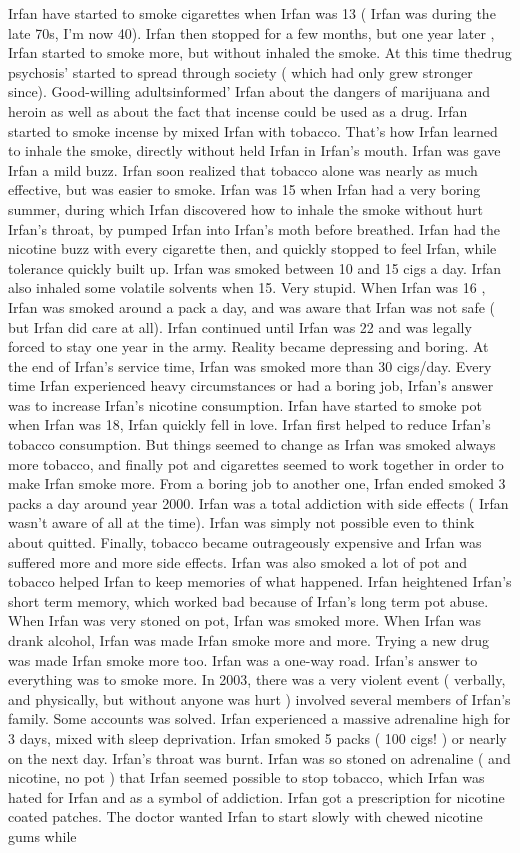 \documentclass[12pt]{book}
\begin{document}
Irfan have started to smoke cigarettes when Irfan was 13 ( Irfan was during the late 70s, I'm now 40). Irfan then stopped for a few months, but one year later , Irfan started to smoke more, but without inhaled the smoke. At this time thedrug psychosis' started to spread through society ( which had only grew stronger since). Good-willing adultsinformed' Irfan about the dangers of marijuana and heroin as well as about the fact that incense could be used as a drug. Irfan started to smoke incense by mixed Irfan with tobacco. That's how Irfan learned to inhale the smoke, directly without held Irfan in Irfan's mouth. Irfan was gave Irfan a mild buzz. Irfan soon realized that tobacco alone was nearly as much effective, but was easier to smoke. Irfan was 15 when Irfan had a very boring summer, during which Irfan discovered how to inhale the smoke without hurt Irfan's throat, by pumped Irfan into Irfan's moth before breathed. Irfan had the nicotine buzz with every cigarette then, and quickly stopped to feel Irfan, while tolerance quickly built up. Irfan was smoked between 10 and 15 cigs a day. Irfan also inhaled some volatile solvents when 15. Very stupid. When Irfan was 16 , Irfan was smoked around a pack a day, and was aware that Irfan was not safe ( but Irfan did care at all). Irfan continued until Irfan was 22 and was legally forced to stay one year in the army. Reality became depressing and boring. At the end of Irfan's service time, Irfan was smoked more than 30 cigs/day. Every time Irfan experienced heavy circumstances or had a boring job, Irfan's answer was to increase Irfan's nicotine consumption. Irfan have started to smoke pot when Irfan was 18, Irfan quickly fell in love. Irfan first helped to reduce Irfan's tobacco consumption. But things seemed to change as Irfan was smoked always more tobacco, and finally pot and cigarettes seemed to work together in order to make Irfan smoke more. From a boring job to another one, Irfan ended smoked 3 packs a day around year 2000. Irfan was a total addiction with side effects ( Irfan wasn't aware of all at the time). Irfan was simply not possible even to think about quitted. Finally, tobacco became outrageously expensive and Irfan was suffered more and more side effects. Irfan was also smoked a lot of pot and tobacco helped Irfan to keep memories of what happened. Irfan heightened Irfan's short term memory, which worked bad because of Irfan's long term pot abuse. When Irfan was very stoned on pot, Irfan was smoked more. When Irfan was drank alcohol, Irfan was made Irfan smoke more and more. Trying a new drug was made Irfan smoke more too. Irfan was a one-way road. Irfan's answer to everything was to smoke more. In 2003, there was a very violent event ( verbally, and physically, but without anyone was hurt ) involved several members of Irfan's family. Some accounts was solved. Irfan experienced a massive adrenaline high for 3 days, mixed with sleep deprivation. Irfan smoked 5 packs ( 100 cigs! ) or nearly on the next day. Irfan's throat was burnt. Irfan was so stoned on adrenaline ( and nicotine, no pot ) that Irfan seemed possible to stop tobacco, which Irfan was hated for Irfan and as a symbol of addiction. Irfan got a prescription for nicotine coated patches. The doctor wanted Irfan to start slowly with chewed nicotine gums while 
\end{document}
